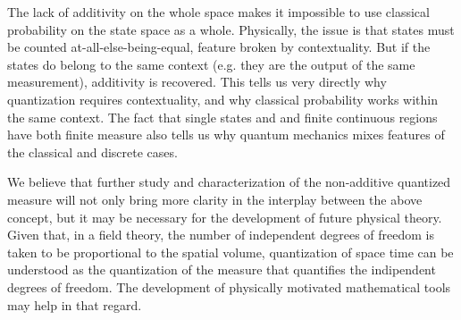 \documentclass[10pt,twocolumn, nofootinbib]{revtex4-2}
\begin{document}
The lack of additivity on the whole space makes it impossible to use classical probability on the state space as a whole. Physically, the issue is that states must be counted at-all-else-being-equal, feature broken by contextuality. But if the states do belong to the same context (e.g. they are the output of the same measurement), additivity is recovered. This tells us very directly why quantization requires contextuality, and why classical probability works within the same context. The fact that single states and and finite continuous regions have both finite measure also tells us why quantum mechanics mixes features of the classical and discrete cases.

We believe that further study and characterization of the non-additive quantized measure will not only bring more clarity in the interplay between the above concept, but it may be necessary for the development of future physical theory. Given that, in a field theory, the number of independent degrees of freedom is taken to be proportional to the spatial volume, quantization of space time can be understood as the quantization of the measure that quantifies the indipendent degrees of freedom. The development of physically motivated mathematical tools may help in that regard.



\newcommand{\pj}[1] {\underbar{$#1$}}
\end{document}
